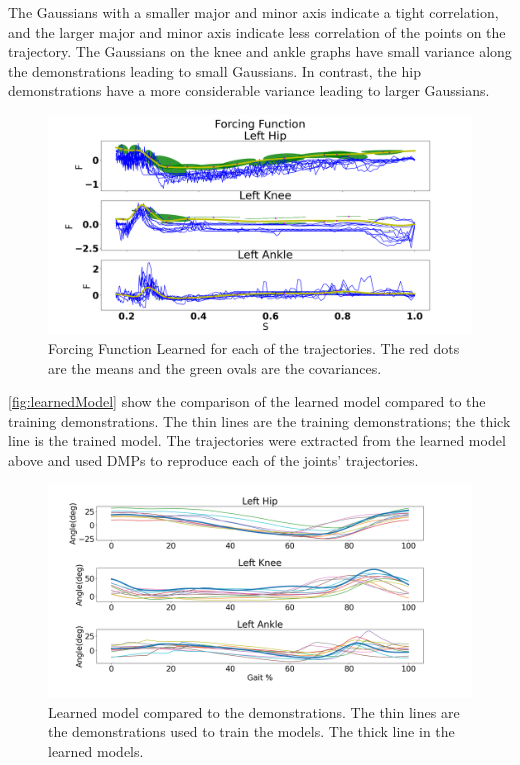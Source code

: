 The Gaussians with a smaller major and minor axis indicate a tight correlation, and the larger major and minor axis indicate less correlation of the points on the trajectory.  The Gaussians on the knee and ankle graphs have small variance along the demonstrations leading to small Gaussians. In contrast, the hip demonstrations have a more considerable variance leading to larger Gaussians.    

\begin{figure}[h]
    \centering
    \includegraphics[scale=0.3]{images/gait_data/force_function2.png}
    \caption[Gait Forcing Function]{Forcing Function Learned for each of the trajectories. The red dots are the means and the green ovals are the covariances.}
    \label{fig:force}
\end{figure}



 \autoref{fig:learnedModel} show the comparison of the learned model compared to the training demonstrations. The thin lines are the training demonstrations; the thick line is the trained model. The trajectories were extracted from the learned model above and used DMPs to reproduce each of the joints' trajectories. 


\begin{figure}[h]
    \centering
    \includegraphics[scale=0.35]{images/gait_data/learnedModel.png}
    \caption[Learned Gait Model]{Learned model compared to the demonstrations. The thin lines are the demonstrations used to train the models. The thick line in the learned models.}
    \label{fig:learnedModel}
\end{figure}


